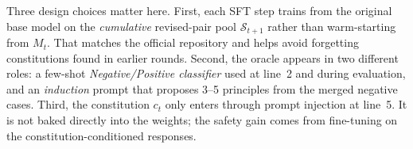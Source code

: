 \documentclass[11pt]{article}
\begin{document}
\begin{figure}[h]
\centering
{}
\label{alg:iteralign}
\end{figure}

Three design choices matter here. First, each SFT step trains from the original base model on the \emph{cumulative} revised-pair pool $\mathcal{S}_{t+1}$ rather than warm-starting from $M_t$. That matches the official repository and helps avoid forgetting constitutions found in earlier rounds. Second, the oracle appears in two different roles: a few-shot \emph{Negative/Positive classifier} used at line~2 and during evaluation, and an \emph{induction} prompt that proposes 3--5 principles from the merged negative cases. Third, the constitution $c_t$ only enters through prompt injection at line~5. It is not baked directly into the weights; the safety gain comes from fine-tuning on the constitution-conditioned responses.
\end{document}
